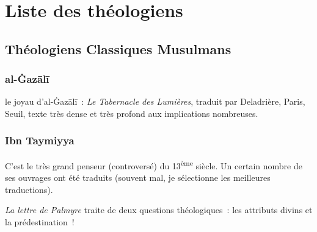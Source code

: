 \chapter{Liste des théologiens}
\startcontents[mainsections]
 



\section{Théologiens Classiques Musulmans}

\subsection{al-Ġazālī}

le joyau d'al-Ġazālī~: \emph{Le Tabernacle des Lumières}, traduit
par Deladrière, Paris, Seuil, texte très dense et très profond aux
implications nombreuses.
\pageref{theol:AlGazali29}
\pageref{theol:AlGazali2}
\pageref{theol:AlGazali3}
\pageref{theol:AlGazali8}
\pageref{theol:AlGazali25}




\subsection{Ibn Taymiyya}


 

C'est le très grand penseur (controversé) du 13\textsuperscript{ème}
siècle. Un certain nombre de ses ouvrages ont été traduits (souvent mal,
je sélectionne les meilleures traductions).


\emph{La lettre de Palmyre} traite de deux questions théologiques~: les
attributs divins et la prédestination~!

